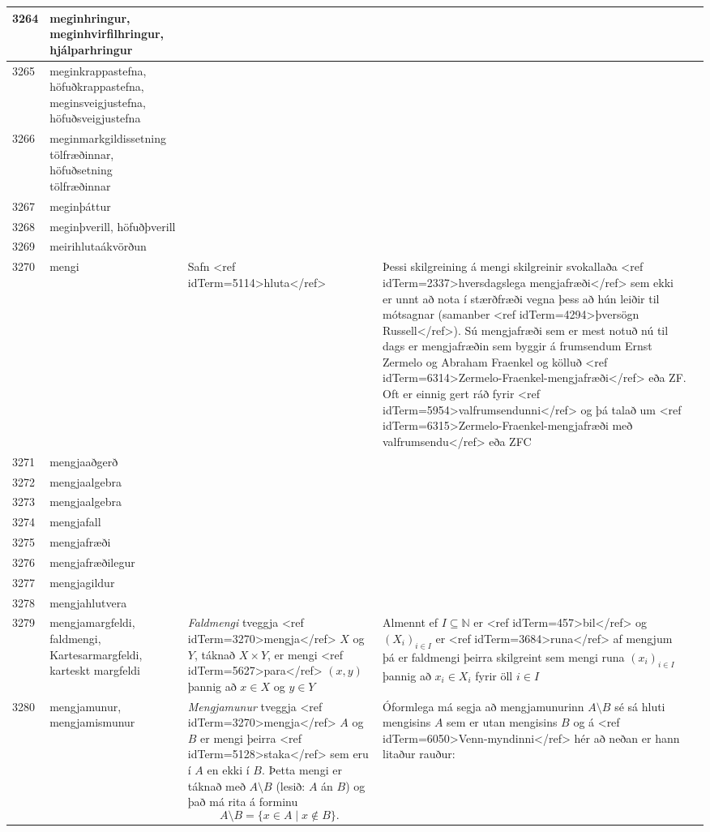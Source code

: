 \begin{longtable}{p{}|p{}|p{}|p{}|p{}}
\hline
3264 & meginhringur, meginhvirfilhringur, hjálparhringur &  &  &  \\
\hline
3265 & meginkrappastefna, höfuðkrappastefna, meginsveigjustefna, höfuðsveigjustefna &  &  &  \\
\hline
3266 & meginmarkgildissetning tölfræðinnar, höfuðsetning tölfræðinnar &  &  &  \\
\hline
3267 & meginþáttur &  &  &  \\
\hline
3268 & meginþverill, höfuðþverill &  &  &  \\
\hline
3269 & meirihlutaákvörðun &  &  &  \\
\hline
3270 & mengi & Safn <ref idTerm=5114>hluta</ref> & Þessi skilgreining á mengi skilgreinir svokallaða <ref idTerm=2337>hversdagslega mengjafræði</ref> sem ekki er unnt að nota í stærðfræði vegna þess að hún leiðir til mótsagnar (samanber <ref idTerm=4294>þversögn Russell</ref>). Sú mengjafræði sem er mest notuð nú til dags er mengjafræðin sem byggir á frumsendum Ernst Zermelo og Abraham Fraenkel og kölluð <ref idTerm=6314>Zermelo-Fraenkel-mengjafræði</ref> eða ZF. Oft er einnig gert ráð fyrir <ref idTerm=5954>valfrumsendunni</ref> og þá talað um <ref idTerm=6315>Zermelo-Fraenkel-mengjafræði með valfrumsendu</ref> eða ZFC &  \\
\hline
3271 & mengjaaðgerð &  &  &  \\
\hline
3272 & mengjaalgebra &  &  &  \\
\hline
3273 & mengjaalgebra &  &  &  \\
\hline
3274 & mengjafall &  &  &  \\
\hline
3275 & mengjafræði &  &  &  \\
\hline
3276 & mengjafræðilegur &  &  &  \\
\hline
3277 & mengjagildur &  &  &  \\
\hline
3278 & mengjahlutvera &  &  &  \\
\hline
3279 & mengjamargfeldi, faldmengi, Kartesarmargfeldi, karteskt margfeldi & \textit{Faldmengi} tveggja <ref idTerm=3270>mengja</ref> $X$ og $Y$, táknað $X \times Y$, er mengi <ref idTerm=5627>para</ref> $(x,y)$ þannig að $x \in X$ og $y \in Y$ & Almennt ef $I \subseteq \mathbb{N}$ er <ref idTerm=457>bil</ref> og $\left(X_i\right)_{i \in I}$ er <ref idTerm=3684>runa</ref> af mengjum þá er faldmengi þeirra skilgreint sem mengi runa $(x_i)_{i \in I}$ þannig að $x_i \in X_i$ fyrir öll $i \in I$ & \\
\hline
3280 & mengjamunur, mengjamismunur & \textit{Mengjamunur} tveggja <ref idTerm=3270>mengja</ref> $A$ og $B$ er mengi þeirra <ref idTerm=5128>staka</ref> sem eru í $A$ en ekki í $B$. Þetta mengi er táknað með $A \setminus B$ (lesið: $A$ án $B$) og það má rita á forminu \[ A \setminus B = \{x \in A \mid x \notin B\}. \] & Óformlega má segja að mengjamunurinn $A \setminus B$ sé sá hluti mengisins $A$ sem er utan mengisins $B$ og á <ref idTerm=6050>Venn-myndinni</ref> hér að neðan er hann litaður rauður:


\end{longtable}
